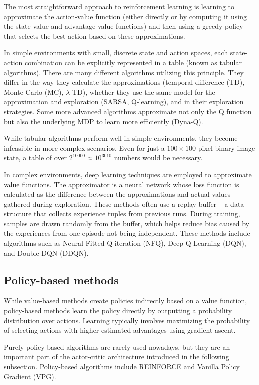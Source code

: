 \documentclass[
  digital,     %
  oneside,     %
  nosansbold,  %
  nocolorbold, %
  lof,         %
  lot,         %
]{fithesis4}
\begin{document}
The most straightforward approach to reinforcement learning is learning to approximate the action-value function (either directly or by computing it using the state-value and advantage-value functions) and then using a greedy policy that selects the best action based on these approximations.

In simple environments with small, discrete state and action spaces, each state-action combination can be explicitly represented in a table (known as tabular algorithms). There are many different algorithms utilizing this principle. They differ in the way they calculate the approximations (temporal difference (TD), Monte Carlo (MC), $\lambda$-TD), whether they use the same model for the approximation and exploration (SARSA, Q-learning), and in their exploration strategies. Some more advanced algorithms approximate not only the Q function but also the underlying MDP to learn more efficiently (Dyna-Q).

While tabular algorithms perform well in simple environments, they become infeasible in more complex scenarios. Even for just a $100 \times 100$ pixel binary image state, a table of over $2^{10000} \approx 10^{3010}$ numbers would be necessary.

In complex environments, deep learning techniques are employed to approximate value functions. The approximator is a neural network whose loss function is calculated as the difference between the approximations and actual values gathered during exploration. These methods often use a replay buffer -- a data structure that collects experience tuples from previous runs. During training, samples are drawn randomly from the buffer, which helps reduce bias caused by the experiences from one episode not being independent. These methods include algorithms such as Neural Fitted Q-iteration (NFQ), Deep Q-Learning (DQN), and Double DQN (DDQN).

\subsection{Policy-based methods}

While value-based methods create policies indirectly based on a value function, policy-based methods learn the policy directly by outputting a probability distribution over actions. Learning typically involves maximizing the probability of selecting actions with higher estimated advantages using gradient ascent.

Purely policy-based algorithms are rarely used nowadays, but they are an important part of the actor-critic architecture introduced in the following subsection. Policy-based algorithms include REINFORCE and Vanilla Policy Gradient (VPG).
\end{document}
